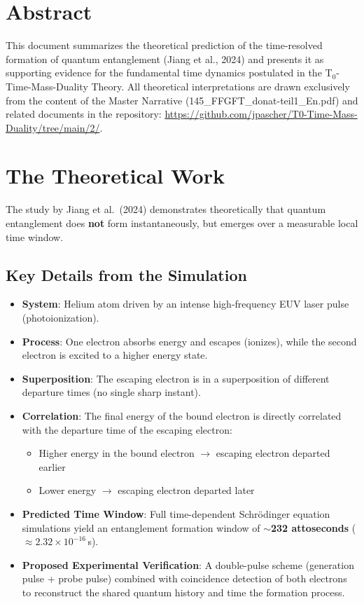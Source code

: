 \section*{Abstract}
		This document summarizes the theoretical prediction of the time-resolved formation of quantum entanglement (Jiang et al., 2024) and presents it as supporting evidence for the fundamental time dynamics postulated in the T$_0$-Time-Mass-Duality Theory. All theoretical interpretations are drawn exclusively from the content of the Master Narrative (145\_FFGFT\_donat-teil1\_En.pdf) and related documents in the repository:
		\url{https://github.com/jpascher/T0-Time-Mass-Duality/tree/main/2/}.

	
	\section{The Theoretical Work}
	The study by Jiang et al.\ (2024) demonstrates theoretically that quantum entanglement does \textbf{not} form instantaneously, but emerges over a measurable local time window.
	
	\subsection{Key Details from the Simulation}
	\begin{itemize}[leftmargin=*]
		\item \textbf{System}: Helium atom driven by an intense high-frequency EUV laser pulse (photoionization).
		\item \textbf{Process}: One electron absorbs energy and escapes (ionizes), while the second electron is excited to a higher energy state.
		\item \textbf{Superposition}: The escaping electron is in a superposition of different departure times (no single sharp instant).
		\item \textbf{Correlation}: The final energy of the bound electron is directly correlated with the departure time of the escaping electron:
		\begin{itemize}
			\item Higher energy in the bound electron $\to$ escaping electron departed earlier
			\item Lower energy $\to$ escaping electron departed later
		\end{itemize}
		\item \textbf{Predicted Time Window}: Full time-dependent Schrödinger equation simulations yield an entanglement formation window of $\sim$\textbf{232 attoseconds} ($\approx 2.32 \times 10^{-16}$\,s).
		\item \textbf{Proposed Experimental Verification}: A double-pulse scheme (generation pulse + probe pulse) combined with coincidence detection of both electrons to reconstruct the shared quantum history and time the formation process.
	\end{itemize}
	
